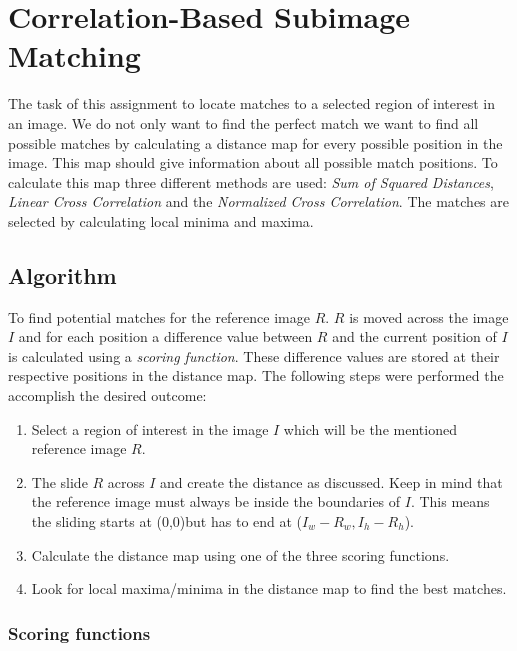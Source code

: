 \chapter{Correlation-Based Subimage Matching}

The task of this assignment to locate matches to a selected region of interest in an image. We do not only want to find the perfect match we want to find all possible matches by calculating a distance map for every possible position in the image. This map should give information about all possible match positions. To calculate this map three different methods are used: \textit{Sum of Squared Distances}, \textit{Linear Cross Correlation} and the \textit{Normalized Cross Correlation}. The matches are selected by calculating local minima and maxima.

\section{Algorithm}
To find potential matches for the reference image $R$. $R$ is moved across the image $I$ and for each position a difference value between $R$ and the current position of $I$ is calculated using a \textit{scoring function}. These difference values are stored at their respective positions in the distance map. The following steps were performed the accomplish the desired outcome:
\begin{enumerate}
	\item Select a region of interest in the image $I$ which will be the mentioned reference image $R$.
	\item The slide $R$ across $I$ and create the distance as discussed. Keep in mind that the reference image must always be inside the boundaries of $I$. This means the sliding starts at (0,0)but has to end at ($I_w - R_w, I_h - R_h$).
	\item Calculate the distance map using one of the three scoring functions.
	\item Look for local maxima/minima in the distance map to find the best matches.
\end{enumerate}

\subsection{Scoring functions}


